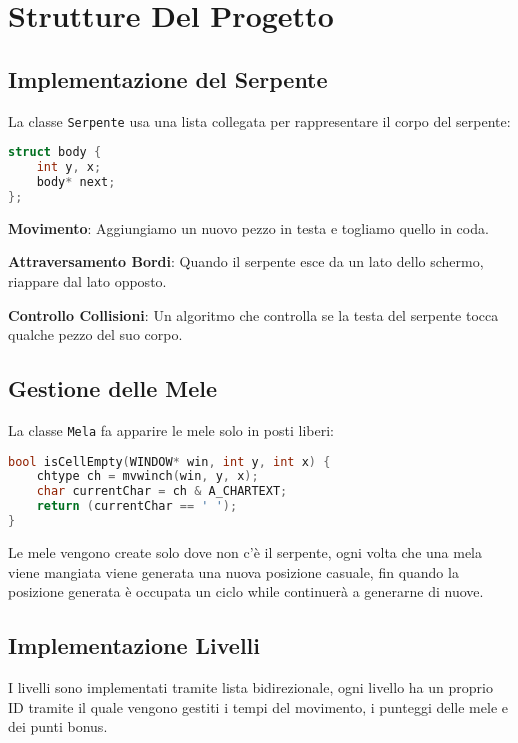 \documentclass[a4paper,12pt]{article}
\begin{document}
\section{Strutture Del Progetto}

\subsection{Implementazione del Serpente}

La classe \texttt{Serpente} usa una lista collegata per rappresentare il corpo del serpente:

\begin{lstlisting}[language=C++]
struct body {
    int y, x;
    body* next;
};
\end{lstlisting}

\textbf{Movimento}: Aggiungiamo un nuovo pezzo in testa e togliamo quello in coda.

\textbf{Attraversamento Bordi}: Quando il serpente esce da un lato dello schermo, riappare dal lato opposto.

\textbf{Controllo Collisioni}: Un algoritmo che controlla se la testa del serpente tocca qualche pezzo del suo corpo.

\subsection{Gestione delle Mele}

La classe \texttt{Mela} fa apparire le mele solo in posti liberi:

\begin{lstlisting}[language=C++]
bool isCellEmpty(WINDOW* win, int y, int x) {
    chtype ch = mvwinch(win, y, x);
    char currentChar = ch & A_CHARTEXT;
    return (currentChar == ' ');
}
\end{lstlisting}

Le mele vengono create solo dove non c'è il serpente, ogni volta che una mela viene mangiata viene generata una nuova posizione casuale, fin quando la posizione generata è occupata un ciclo while continuerà a generarne di nuove.

\subsection{Implementazione Livelli}

I livelli sono implementati tramite lista bidirezionale, ogni livello ha un proprio ID tramite il quale vengono gestiti i tempi del movimento, i punteggi delle mele e dei punti bonus.
\end{document}
